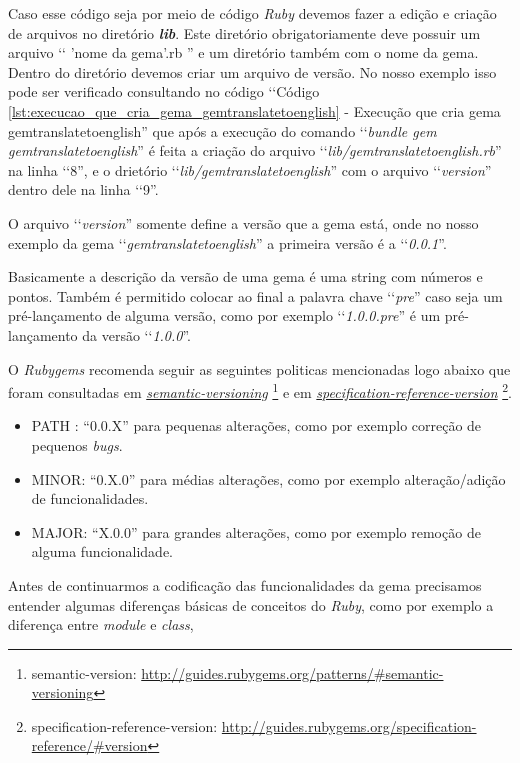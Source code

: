 Caso esse código seja por meio de código \emph{Ruby} devemos fazer a edição e criação de arquivos no 
diretório \emph{\textbf{lib}}. Este diretório obrigatoriamente deve possuir um arquivo 
‘‘ 'nome da gema'.rb '' e um diretório também com o nome da gema. Dentro do diretório devemos criar um 
arquivo de versão. No nosso exemplo isso pode ser verificado consultando no código ‘‘Código 
\ref{lst:execucao_que_cria_gema_gemtranslatetoenglish} - Execução que cria gema gemtranslatetoenglish'' 
que após a execução do comando ‘‘\emph{bundle gem gemtranslatetoenglish}'' é feita a criação do arquivo 
‘‘\emph{lib/gemtranslatetoenglish.rb}'' na linha ‘‘8'', e o drietório ‘‘\emph{lib/gemtranslatetoenglish}'' 
com o arquivo ‘‘\emph{version}'' dentro dele na linha ‘‘9''.

O arquivo ‘‘\emph{version}'' somente define a versão que a gema está, onde no nosso exemplo da gema 
‘‘\emph{gemtranslatetoenglish}'' a primeira versão é a ‘‘\emph{0.0.1}''. 

Basicamente a descrição da versão de uma gema é uma string com números e pontos. Também é permitido 
colocar ao final a palavra chave ‘‘\emph{pre}'' caso seja um pré-lançamento de alguma versão, como 
por exemplo ‘‘\emph{1.0.0.pre}'' é um pré-lançamento da versão ‘‘\emph{1.0.0}''.

O \emph{Rubygems} recomenda seguir as seguintes politicas mencionadas logo abaixo que foram consultadas
em \emph{\href{http://guides.rubygems.org/patterns/\#semantic-versioning}{semantic-versioning}}
\footnote{semantic-version: \url{http://guides.rubygems.org/patterns/\#semantic-versioning}} e em
\emph{\href{http://guides.rubygems.org/specification-reference/\#version}{specification-reference-version}}
\footnote{specification-reference-version: \url{http://guides.rubygems.org/specification-reference/\#version}}.

\begin{itemize}
 \item PATH : “0.0.X” para pequenas alterações, como por exemplo correção de pequenos \emph{bugs}.
 \item MINOR: “0.X.0” para médias alterações, como por exemplo alteração/adição de funcionalidades.
 \item MAJOR: “X.0.0” para grandes alterações, como por exemplo remoção de alguma funcionalidade.
\end{itemize}

Antes de continuarmos a codificação das funcionalidades da gema precisamos entender algumas diferenças
básicas de conceitos do \emph{Ruby}, como por exemplo a diferença entre \emph{module} e \emph{class},

